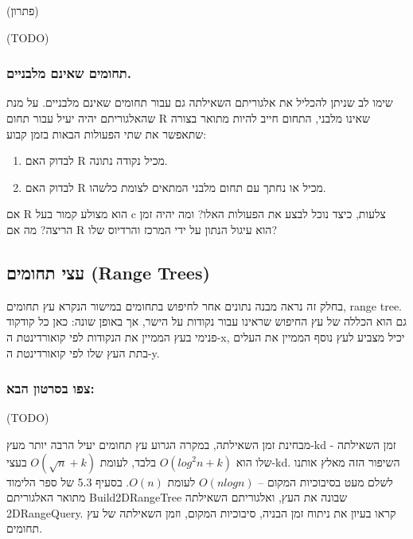 \documentclass[
]{book}
\providecommand{\tightlist}{%
  \setlength{\itemsep}{0pt}\setlength{\parskip}{0pt}}
\begin{document}
(פתרון)

(TODO)

\hypertarget{ux5eaux5d7ux5d5ux5deux5d9ux5dd-ux5e9ux5d0ux5d9ux5e0ux5dd-ux5deux5dcux5d1ux5e0ux5d9ux5d9ux5dd.}{%
\subsubsection*{תחומים שאינם מלבניים.}\label{ux5eaux5d7ux5d5ux5deux5d9ux5dd-ux5e9ux5d0ux5d9ux5e0ux5dd-ux5deux5dcux5d1ux5e0ux5d9ux5d9ux5dd.}}

שימו לב שניתן להכליל את אלגוריתם השאילתה גם עבור תחומים שאינם מלבניים. על מנת שהאלגוריתם יהיה יעיל עבור תחום R שאינו מלבני, התחום חייב להיות מתואר בצורה שתאפשר את שתי הפעולות הבאות בזמן קבוע:

\begin{enumerate}
\def\labelenumi{\arabic{enumi}.}
\tightlist
\item
  לבדוק האם R מכיל נקודה נתונה.
\item
  לבדוק האם R מכיל או נחתך עם תחום מלבני המתאים לצומת כלשהו.
\end{enumerate}

אם R הוא מצולע קמור בעל c צלעות, כיצד נוכל לבצע את הפעולות האלו? ומה יהיה זמן הריצה? מה אם R הוא עיגול הנתון על ידי המרכז והרדיוס שלו?

\hypertarget{range-trees}{%
\subsection{עצי תחומים (Range Trees)}\label{range-trees}}

בחלק זה נראה מבנה נתונים אחר לחיפוש בתחומים במישור הנקרא עץ תחומים, range tree. גם הוא הכללה של עץ החיפוש שראינו עבור נקודות על הישר, אך באופן שונה: כאן כל קודקוד פנימי בעץ הממיין את הנקודות לפי קואורדינטת ה-x, יכיל מצביע לעץ נוסף הממיין את העלים בתת העץ שלו לפי קואורדינטת ה-y.

\hypertarget{ux5e6ux5e4ux5d5-ux5d1ux5e1ux5e8ux5d8ux5d5ux5df-ux5d4ux5d1ux5d0-6}{%
\subsubsection*{צפו בסרטון הבא:}\label{ux5e6ux5e4ux5d5-ux5d1ux5e1ux5e8ux5d8ux5d5ux5df-ux5d4ux5d1ux5d0-6}}

(TODO)

מבחינת זמן השאילתה, במקרה הגרוע עץ תחומים יעיל הרבה יותר מעץ-kd - זמן השאילתה שלו הוא \(O( log^2 n + k)\) בלבד, לעומת \(O( \sqrt{n}+k)\) בעצי-kd. השיפור הזה מאלץ אותנו לשלם מעט בסיבוכיות המקום -- \(O( n log n)\) לעומת \(O( n)\). בסעיף 5.3 של ספר הלימוד מתואר האלגוריתם Build2DRangeTree שבונה את העץ, ואלגוריתם השאילתה 2DRangeQuery. קראו בעיון את ניתוח זמן הבניה, סיבוכיות המקום, וזמן השאילתה של עץ תחומים.
\end{document}
